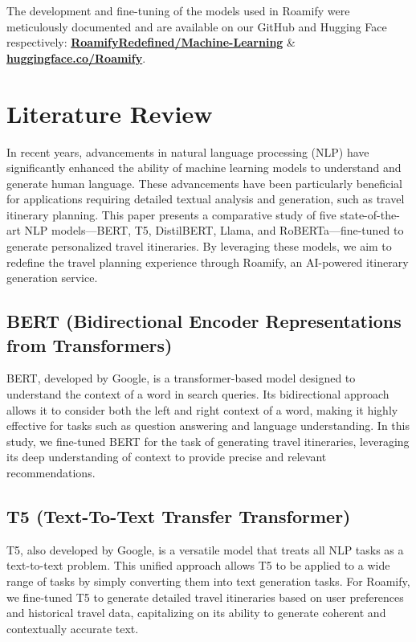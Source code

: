 \documentclass[conference]{IEEEtran}
\begin{document}
    The development and fine-tuning of the models used in Roamify were meticulously documented and are available on our GitHub and Hugging Face respectively: \href{https://github.com/RoamifyRedefined/Machine-Learning}{\textbf{RoamifyRedefined/Machine-Learning}} \& \href{https://huggingface.co/Roamify}{\textbf{huggingface.co/Roamify}}.


\section{Literature Review}

    In recent years, advancements in natural language processing (NLP) have significantly enhanced the ability of machine learning models to understand and generate human language. These advancements have been particularly beneficial for applications requiring detailed textual analysis and generation, such as travel itinerary planning. This paper presents a comparative study of five state-of-the-art NLP models—BERT, T5, DistilBERT, Llama, and RoBERTa—fine-tuned to generate personalized travel itineraries. By leveraging these models, we aim to redefine the travel planning experience through Roamify, an AI-powered itinerary generation service.

    \subsection{BERT (Bidirectional Encoder Representations from Transformers)}
        BERT, developed by Google, is a transformer-based model designed to understand the context of a word in search queries. Its bidirectional approach allows it to consider both the left and right context of a word, making it highly effective for tasks such as question answering and language understanding. In this study, we fine-tuned BERT for the task of generating travel itineraries, leveraging its deep understanding of context to provide precise and relevant recommendations.

    \subsection{T5 (Text-To-Text Transfer Transformer)}
        T5, also developed by Google, is a versatile model that treats all NLP tasks as a text-to-text problem. This unified approach allows T5 to be applied to a wide range of tasks by simply converting them into text generation tasks. For Roamify, we fine-tuned T5 to generate detailed travel itineraries based on user preferences and historical travel data, capitalizing on its ability to generate coherent and contextually accurate text.
\end{document}
